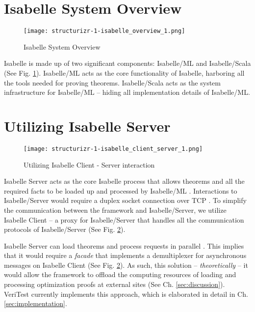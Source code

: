 \section{Isabelle System Overview}
\label{sec:IsabelleSystemOverview}

\begin{figure}[h]
      \centering
      \texttt{[image: structurizr-1-isabelle\_overview\_1.png]}
      \caption{Isabelle System Overview}
      \label{fig:IsabelleSystem}
\end{figure}

Isabelle is made up of two significant components: Isabelle/ML and Isabelle/Scala \cite[Ch. 5]{isabelleSystem} (See Fig. \ref{fig:IsabelleSystem}). 
Isabelle/ML acts as the core functionality of Isabelle, harboring all the tools needed for proving theorems. Isabelle/Scala acts as the system 
infrastructure for Isabelle/ML -- hiding all implementation details of Isabelle/ML.

\section{Utilizing Isabelle Server}
\label{sec:IsabelleServer}

\begin{figure}[h]
      \centering
      \texttt{[image: structurizr-1-isabelle\_client\_server\_1.png]}
      \caption{Utilizing Isabelle Client - Server interaction}
      \label{fig:IsabelleServer}
\end{figure}

Isabelle Server acts as the core Isabelle process that allows theorems and all the required facts to be loaded up and processed by Isabelle/ML
\cite[Ch. 4]{isabelleSystem}. Interactions to Isabelle/Server would require a duplex socket connection over TCP \cite[Sec. 4.2]{isabelleSystem}. 
To simplify the communication between the framework and Isabelle/Server, we utilize Isabelle Client \cite[Sec. 4.1.2]{isabelleSystem} -- a proxy 
for Isabelle/Server that handles all the communication protocols of Isabelle/Server (See Fig. \ref{fig:IsabelleServer}).

Isabelle Server can load theorems and process requests in parallel \cite[Sec. 4.2.6]{isabelleSystem}. This implies that it would require a 
\emph{facade} that implements a demultiplexer for asynchronous messages on Isabelle Client (See Fig. \ref{fig:IsabelleServer}). As such, this 
solution -- \emph{theoretically} -- it would allow the framework to offload the computing resources of loading 
and processing optimization proofs at external sites (See Ch. \ref{sec:discussion}). VeriTest currently implements this approach, which is 
elaborated in detail in Ch. \ref{sec:implementation}.

